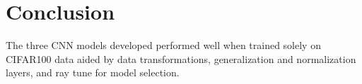 \documentclass[conference]{IEEEtran}
\begin{document}
\section{Conclusion} \label{sec: conclusion}
The three CNN models developed performed well when trained solely on CIFAR100 data aided by data transformations, generalization and normalization layers, and ray tune for model selection.


\end{document}
